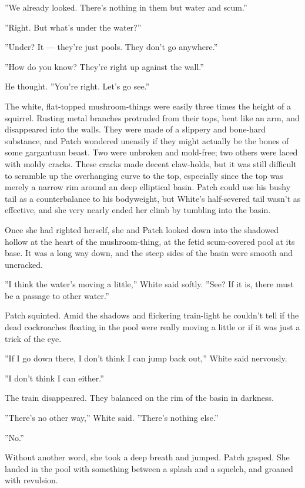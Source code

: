 \documentclass[12pt]{book}
\begin{document}
''We already looked. There's nothing in them but water and scum.''

''Right. But what's under the water?''

''Under? It --- they're just pools. They don't go anywhere.''

''How do you know? They're right up against the wall.''

He thought. ''You're right. Let's go see.''

The white, flat-topped mushroom-things were easily three times the
height of a squirrel. Rusting metal branches protruded from their
tops, bent like an arm, and disappeared into the walls. They were made
of a slippery and bone-hard substance, and Patch wondered uneasily if
they might actually be the bones of some gargantuan beast. Two were
unbroken and mold-free; two others were laced with moldy cracks. These
cracks made decent claw-holds, but it was still difficult to scramble
up the overhanging curve to the top, especially since the top was
merely a narrow rim around an deep elliptical basin. Patch could use
his bushy tail as a counterbalance to his bodyweight, but White's
half-severed tail wasn't as effective, and she very nearly ended her
climb by tumbling into the basin.

Once she had righted herself, she and Patch looked down into the
shadowed hollow at the heart of the mushroom-thing, at the fetid
scum-covered pool at its base. It was a long way down, and the steep
sides of the basin were smooth and uncracked.

''I think the water's moving a little,'' White said softly. ''See? If
it is, there must be a passage to other water.''

Patch squinted. Amid the shadows and flickering train-light he
couldn't tell if the dead cockroaches floating in the pool were really
moving a little or if it was just a trick of the eye.

''If I go down there, I don't think I can jump back out,'' White said
nervously.

''I don't think I can either.''

The train disappeared. They balanced on the rim of the basin in
darkness.

''There's no other way,'' White said. ''There's nothing else.''

''No.''

Without another word, she took a deep breath and jumped. Patch
gasped. She landed in the pool with something between a splash and a
squelch, and groaned with revulsion.
\end{document}
